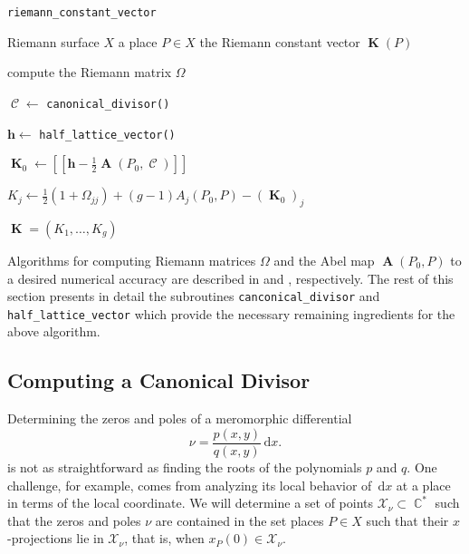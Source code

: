 \documentclass[12pt]{article}
\theoremstyle{definition}
\DeclareMathOperator{\CC}{\mathbb{C}}
\newcommand{\dx}{\,\mathrm{d}x}
\DeclareMathOperator{\DivC}{\mathcal{C}}
\DeclareMathOperator{\RCV}{\boldsymbol{K}}
\DeclareMathOperator{\Abel}{\boldsymbol{A}}
\begin{document}
\begin{algorithm}[H]
\caption{\tt riemann\_constant\_vector}
\label{alg:overview}
\begin{algorithmic}[1]
  \Require Riemann surface $X$
  \Require a place $P \in X$
  \Ensure the Riemann constant vector $\RCV(P)$

  \State compute the Riemann matrix $\Omega$

  \State $\DivC \gets$ \verb=canonical_divisor()=

  \State $\boldsymbol{h} \gets$ \verb=half_lattice_vector()=

  \State $\RCV_0 \gets \left[ \left[ \boldsymbol{h} -
      \tfrac{1}{2}\Abel(P_0,\DivC) \right] \right]$


      \State $K_j \gets \tfrac{1}{2}(1+\Omega_{jj}) + (g-1)A_j(P_0,P) -
      (\RCV_0)_j$

  \EndFor

  \State \Return $\RCV = (K_1, \ldots, K_g)$
\end{algorithmic}
\end{algorithm}

Algorithms for computing Riemann matrices $\Omega$ and the Abel map
$\Abel(P_0,P)$ to a desired numerical accuracy are described in
\cite{DeconinckPatterson11} and \cite{DeconinckPatterson08},
respectively. The rest of this section presents in detail the
subroutines \verb=canconical_divisor= and \verb=half_lattice_vector=
which provide the necessary remaining ingredients for the above
algorithm.



\subsection{Computing a Canonical Divisor}\label{sec:canonical}



Determining the zeros and poles of a meromorphic differential
\[
\nu = \frac{p(x,y)}{q(x,y)}\dx.
\]
is not as straightforward as finding the roots of the polynomials $p$
and $q$. One challenge, for example, comes from analyzing its local
behavior of $\dx$ at a place in terms of the local coordinate. We will
determine a set of points $\mathcal{X}_\nu \subset \CC^*$ such that the
zeros and poles $\nu$ are contained in the set places $P \in X$ such
that their $x$-projections lie in $\mathcal{X}_\nu$, that is, when
$x_P(0) \in \mathcal{X}_\nu$.
\end{document}
